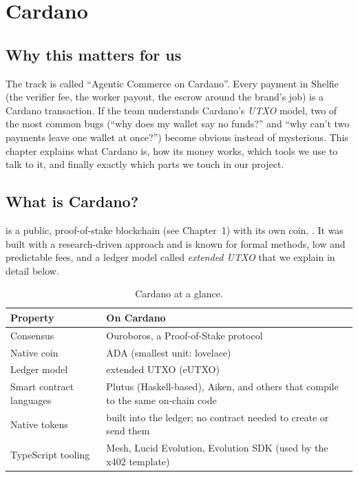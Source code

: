 \chapter{Cardano}

\section*{Why this matters for us}
The track is called ``Agentic Commerce on Cardano''. Every payment in Shelfie (the verifier fee, the worker payout, the escrow around the brand's job) is a Cardano transaction. If the team understands Cardano's \emph{UTXO} model, two of the most common bugs (``why does my wallet say no funds?'' and ``why can't two payments leave one wallet at once?'') become obvious instead of mysterious. This chapter explains what Cardano is, how its money works, which tools we use to talk to it, and finally exactly which parts we touch in our project.

\section{What is Cardano?}

 is a public, proof-of-stake blockchain (see Chapter~1) with its own coin, . It was built with a research-driven approach and is known for formal methods, low and predictable fees, and a ledger model called \emph{extended UTXO} that we explain in detail below.

\begin{table}[h]
\centering
\small
\begin{tabular}{@{}p{4.2cm}p{10.2cm}@{}}
\toprule
\textbf{Property} & \textbf{On Cardano}\\
\midrule
Consensus & Ouroboros, a Proof-of-Stake protocol\\
Native coin & ADA (smallest unit: lovelace)\\
Ledger model & extended UTXO (eUTXO)\\
Smart contract languages & Plutus (Haskell-based), Aiken, and others that compile to the same on-chain code\\
Native tokens & built into the ledger; no contract needed to create or send them\\
TypeScript tooling & Mesh, Lucid Evolution, Evolution SDK (used by the x402 template)\\
\bottomrule
\end{tabular}
\caption{Cardano at a glance.}
\end{table}

